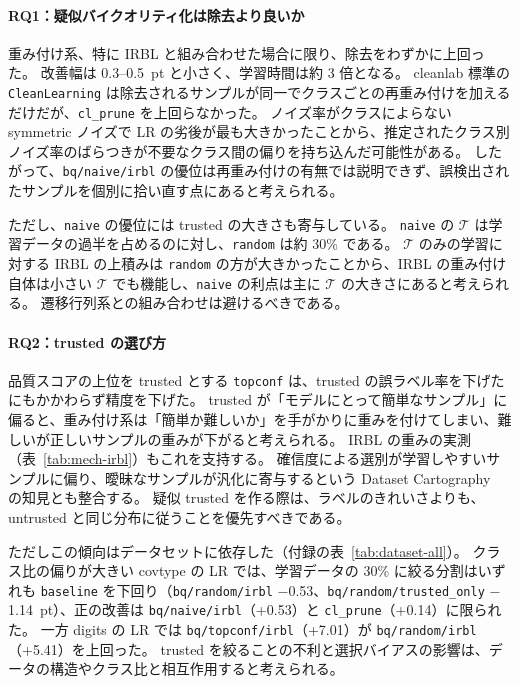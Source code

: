 \documentclass[a4paper,10pt]{ltjsarticle}
\newcommand{\method}[1]{\texttt{#1}}
\newcommand{\cl}{\textsf{cleanlab}}
\begin{document}
\paragraph{RQ1：疑似バイクオリティ化は除去より良いか}
重み付け系、特に IRBL と組み合わせた場合に限り、除去をわずかに上回った。
改善幅は 0.3--0.5~pt と小さく、学習時間は約 3 倍となる。
\cl{} 標準の \texttt{CleanLearning} は除去されるサンプルが同一でクラスごとの再重み付けを加えるだけだが、\method{cl\_prune} を上回らなかった。
ノイズ率がクラスによらない symmetric ノイズで LR の劣後が最も大きかったことから、推定されたクラス別ノイズ率のばらつきが不要なクラス間の偏りを持ち込んだ可能性がある。
したがって、\method{bq/naive/irbl} の優位は再重み付けの有無では説明できず、誤検出されたサンプルを個別に拾い直す点にあると考えられる。

ただし、\method{naive} の優位には trusted の大きさも寄与している。
\method{naive} の $\mathcal{T}$ は学習データの過半を占めるのに対し、\method{random} は約 30\% である。
$\mathcal{T}$ のみの学習に対する IRBL の上積みは \method{random} の方が大きかったことから、IRBL の重み付け自体は小さい $\mathcal{T}$ でも機能し、\method{naive} の利点は主に $\mathcal{T}$ の大きさにあると考えられる。
遷移行列系との組み合わせは避けるべきである。

\paragraph{RQ2：trusted の選び方}
品質スコアの上位を trusted とする \method{topconf} は、trusted の誤ラベル率を下げたにもかかわらず精度を下げた。
trusted が「モデルにとって簡単なサンプル」に偏ると、重み付け系は「簡単か難しいか」を手がかりに重みを付けてしまい、難しいが正しいサンプルの重みが下がると考えられる。
IRBL の重みの実測（表~\ref{tab:mech-irbl}）もこれを支持する。
確信度による選別が学習しやすいサンプルに偏り、曖昧なサンプルが汎化に寄与するという Dataset Cartography~\cite{swayamdipta2020cartography} の知見とも整合する。
疑似 trusted を作る際は、ラベルのきれいさよりも、untrusted と同じ分布に従うことを優先すべきである。

ただしこの傾向はデータセットに依存した（付録の表~\ref{tab:dataset-all}）。
クラス比の偏りが大きい covtype の LR では、学習データの 30\% に絞る分割はいずれも \method{baseline} を下回り（\method{bq/random/irbl} $-$0.53、\method{bq/random/trusted\_only} $-$1.14~pt）、正の改善は \method{bq/naive/irbl}（+0.53）と \method{cl\_prune}（+0.14）に限られた。
一方 digits の LR では \method{bq/topconf/irbl}（+7.01）が \method{bq/random/irbl}（+5.41）を上回った。
trusted を絞ることの不利と選択バイアスの影響は、データの構造やクラス比と相互作用すると考えられる。
\end{document}
